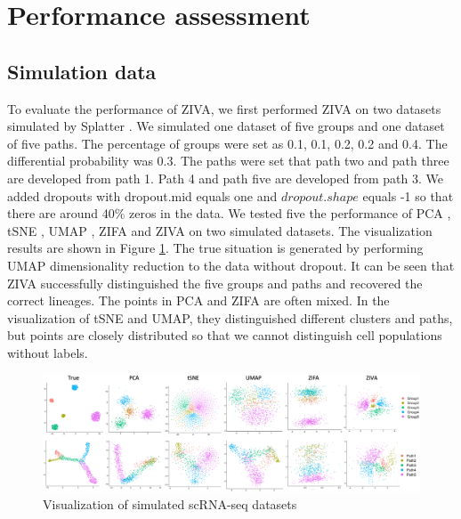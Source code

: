 \section{Performance assessment}
\subsection{Simulation data}
To evaluate the performance of ZIVA, we first performed ZIVA on two datasets simulated by Splatter \cite{zappia2017splatter}. We simulated one dataset of five groups and one dataset of five paths. The percentage of groups were set as 0.1, 0.1, 0.2, 0.2 and 0.4. The differential probability was 0.3. The paths were set that path two and path three are developed from path 1. Path 4 and path five are developed from path 3. We added dropouts with dropout.mid equals one and $dropout.shape$ equals -1 so that there are around 40\% zeros in the data. We tested five the performance of PCA \cite{Abdi2010}, tSNE \cite{maaten2008visualizing}, UMAP \cite{McInnes2018}, ZIFA \cite{Pierson2015} and ZIVA on two simulated datasets. The visualization results are shown in Figure \ref{sim}. The true situation is generated by performing UMAP dimensionality reduction to the data without dropout. It can be seen that ZIVA successfully distinguished the five groups and paths and recovered the correct lineages. The points in PCA and ZIFA are often mixed. In the visualization of tSNE and UMAP, they distinguished different clusters and paths, but points are closely distributed so that we cannot distinguish cell populations without labels. 
\begin{figure}[htb!]
    \centering
    \includegraphics[width=1\textwidth]{figures/myfigures/simdata.png}
    \caption{Visualization of simulated scRNA-seq datasets}
    \label{sim}
\end{figure}

\clearpage

